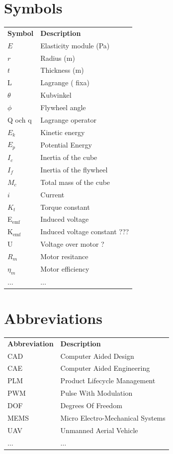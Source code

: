 \documentclass[a4paper,11pt]{kth-mag}
\newcommand{\textunderscript}[1]{$_{\text{#1}}$}
\begin{document}
\section*{Symbols}
\noindent{}\begin{tabular}{@{}p{2.5cm}l}
\textbf{Symbol} 	& \textbf{Description} \vspace{.5em} \\
$E$ 		& Elasticity module (Pa) \\
$r$		& Radius (m) \\
$t$		& Thickness (m) \\
L			& Lagrange ( fixa) \\
$\theta$		& Kubvinkel \\
$\phi$		& Flywheel angle \\
Q och q		& Lagrange operator \\
$E_k	$		& Kinetic energy \\
$E_p$		& Potential Energy \\
$I_c$		& Inertia of the cube\\
$I_f$		& Inertia of the flywheel\\
$M_c$		& Total mass of the cube \\
$i$			& Current\\
$K_t$		& Torque constant\\

E\textunderscript{emf} 	& Induced voltage \\
K\textunderscript{emf} 	& Induced voltage constant ??? \\

U			& Voltage over motor ?\\
$R_m	$		& Motor resitance \\
$\eta_m$		& Motor efficiency\\	
$\ldots$	& $\ldots$ 
\end{tabular}

\section*{Abbreviations}
\noindent{}\begin{tabular}{@{}p{2.5cm}l}
\textbf{Abbreviation} 	& \textbf{Description} \vspace{.5em} \\
CAD			& Computer Aided Design \\
CAE			& Computer Aided Engineering\\
PLM			& Product Lifecycle Management\\
PWM			& Pulse With Modulation\\
DOF			& Degrees Of Freedom\\
MEMS			& Micro Electro-Mechanical Systems\\
UAV			& Unmanned Aerial Vehicle \\
$\ldots$		& $\ldots$ 
\end{tabular}
\cleardoublepage
\end{document}

